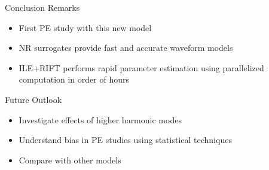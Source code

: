 \documentclass[uncompress,aspectratio=43]{beamer}  %
\begin{document}
    \begin{frame}{Conclusion}
      Remarks
      \begin{itemize}
      \item First PE study with this new model
       \item NR surrogates provide fast and accurate waveform models
    \item ILE+RIFT performs rapid parameter estimation using parallelized
      computation in order of hours
\end{itemize}
   
      \medskip
      Future Outlook
      \begin{itemize}
      \item Investigate effects of higher harmonic modes
      \item Understand bias in PE studies using statistical techniques
        \item Compare with other models
        \end{itemize}
      \end{frame}
\end{document}
